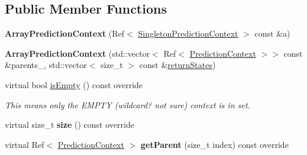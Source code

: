 \subsection*{Public Member Functions}
\begin{DoxyCompactItemize}
\item 
\mbox{\label{classantlr4_1_1atn_1_1ArrayPredictionContext_aeca230e73c888171d0fc31039df4eee7}} 
{\bfseries Array\+Prediction\+Context} (Ref$<$ \hyperlink{classantlr4_1_1atn_1_1SingletonPredictionContext}{Singleton\+Prediction\+Context} $>$ const \&a)
\item 
\mbox{\label{classantlr4_1_1atn_1_1ArrayPredictionContext_a2ee2b2e07f1dd9dbcbfce902a092cd75}} 
{\bfseries Array\+Prediction\+Context} (std\+::vector$<$ Ref$<$ \hyperlink{classantlr4_1_1atn_1_1PredictionContext}{Prediction\+Context} $>$$>$ const \&parents\+\_\+, std\+::vector$<$ size\+\_\+t $>$ const \&\hyperlink{classantlr4_1_1atn_1_1ArrayPredictionContext_a40497e962ffa3f1d97695061b8222997}{return\+States})
\item 
\mbox{\label{classantlr4_1_1atn_1_1ArrayPredictionContext_af2b9b082a447b8c00ebb0a99e7ca194d}} 
virtual bool \hyperlink{classantlr4_1_1atn_1_1ArrayPredictionContext_af2b9b082a447b8c00ebb0a99e7ca194d}{is\+Empty} () const override
\begin{DoxyCompactList}\small\item\em This means only the E\+M\+P\+TY (wildcard? not sure) context is in set. \end{DoxyCompactList}\item 
\mbox{\label{classantlr4_1_1atn_1_1ArrayPredictionContext_a43a67555978f04529235e9221ddda067}} 
virtual size\+\_\+t {\bfseries size} () const override
\item 
\mbox{\label{classantlr4_1_1atn_1_1ArrayPredictionContext_a88a7a39151383ce08981056483f97724}} 
virtual Ref$<$ \hyperlink{classantlr4_1_1atn_1_1PredictionContext}{Prediction\+Context} $>$ {\bfseries get\+Parent} (size\+\_\+t index) const override
\item 
\mbox{\label{classantlr4_1_1atn_1_1ArrayPredictionContext_a9480cef9dfc74e5b8372c4c7f60c4c16}} 
$$
\end{DoxyCompactItemize}
